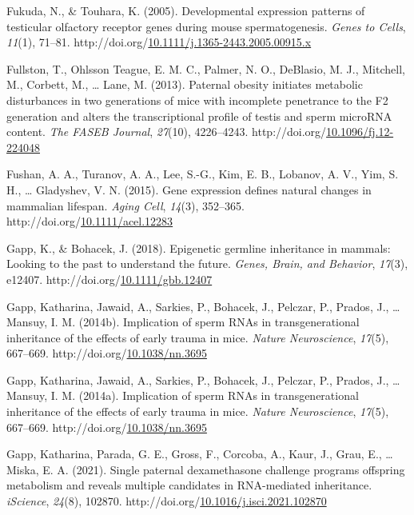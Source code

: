 \documentclass[12pt,twoside]{reedthesis}
\newlength{\cslhangindent}
\newenvironment{CSLReferences}[2] %
 {%
  \setlength{\parindent}{0pt}
  \ifodd #1 \everypar{\setlength{\hangindent}{\cslhangindent}}\ignorespaces\fi
  \ifnum #2 > 0
  \setlength{\parskip}{#2\baselineskip}
  \fi
 }%
 {}
\begin{document}
\begin{CSLReferences}{1}{0}
\leavevmode{}%
Fukuda, N., \& Touhara, K. (2005). Developmental expression patterns of testicular olfactory receptor genes during mouse spermatogenesis. \emph{Genes to Cells}, \emph{11}(1), 71--81. http://doi.org/\href{https://doi.org/10.1111/j.1365-2443.2005.00915.x}{10.1111/j.1365-2443.2005.00915.x}

\leavevmode{}%
Fullston, T., Ohlsson Teague, E. M. C., Palmer, N. O., DeBlasio, M. J., Mitchell, M., Corbett, M., \ldots{} Lane, M. (2013). Paternal obesity initiates metabolic disturbances in two generations of mice with incomplete penetrance to the F2 generation and alters the transcriptional profile of testis and sperm microRNA content. \emph{The FASEB Journal}, \emph{27}(10), 4226--4243. http://doi.org/\href{https://doi.org/10.1096/fj.12-224048}{10.1096/fj.12-224048}

\leavevmode{}%
Fushan, A. A., Turanov, A. A., Lee, S.-G., Kim, E. B., Lobanov, A. V., Yim, S. H., \ldots{} Gladyshev, V. N. (2015). Gene expression defines natural changes in mammalian lifespan. \emph{Aging Cell}, \emph{14}(3), 352--365. http://doi.org/\href{https://doi.org/10.1111/acel.12283}{10.1111/acel.12283}

\leavevmode{}%
Gapp, K., \& Bohacek, J. (2018). Epigenetic germline inheritance in mammals: Looking to the past to understand the future. \emph{Genes, Brain, and Behavior}, \emph{17}(3), e12407. http://doi.org/\href{https://doi.org/10.1111/gbb.12407}{10.1111/gbb.12407}

\leavevmode{}%
Gapp, Katharina, Jawaid, A., Sarkies, P., Bohacek, J., Pelczar, P., Prados, J., \ldots{} Mansuy, I. M. (2014b). Implication of sperm {RNAs} in transgenerational inheritance of the effects of early trauma in mice. \emph{Nature Neuroscience}, \emph{17}(5), 667--669. http://doi.org/\href{https://doi.org/10.1038/nn.3695}{10.1038/nn.3695}

\leavevmode{}%
Gapp, Katharina, Jawaid, A., Sarkies, P., Bohacek, J., Pelczar, P., Prados, J., \ldots{} Mansuy, I. M. (2014a). Implication of sperm RNAs in transgenerational inheritance of the effects of early trauma in mice. \emph{Nature Neuroscience}, \emph{17}(5), 667--669. http://doi.org/\href{https://doi.org/10.1038/nn.3695}{10.1038/nn.3695}

\leavevmode{}%
Gapp, Katharina, Parada, G. E., Gross, F., Corcoba, A., Kaur, J., Grau, E., \ldots{} Miska, E. A. (2021). Single paternal dexamethasone challenge programs offspring metabolism and reveals multiple candidates in RNA-mediated inheritance. \emph{iScience}, \emph{24}(8), 102870. http://doi.org/\href{https://doi.org/10.1016/j.isci.2021.102870}{10.1016/j.isci.2021.102870}


\end{CSLReferences}
\end{document}
